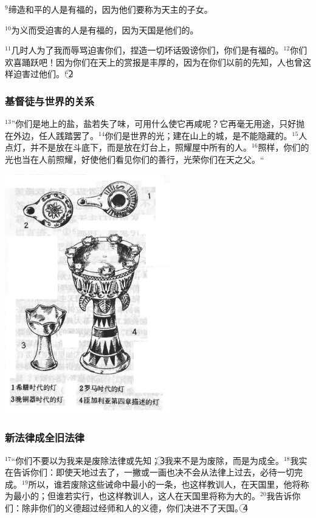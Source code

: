 $^{9}$缔造和平的人是有福的，因为他们要称为天主的子女。

$^{10}$为义而受迫害的人是有福的，因为天国是他们的。

$^{11}$几时人为了我而辱骂迫害你们，捏造一切坏话毁谤你们，你们是有福的。$^{12}$你们欢喜踊跃吧！因为你们在天上的赏报是丰厚的，因为在你们以前的先知，人也曾这样迫害过他们。“\textcircled{2}


\subsubsection{基督徒与世界的关系}
$^{13}$”你们是地上的盐，盐若失了味，可用什么使它再咸呢？它再毫无用途，只好抛在外边，任人践踏罢了。$^{14}$你们是世界的光；建在山上的城，是不能隐藏的。$^{15}$人点灯，并不是放在斗底下，而是放在灯台上，照耀屋中所有的人。$^{16}$照样，你们的光也当在人前照耀，好使他们看见你们的善行，光荣你们在天之父。“
\begin{center}
  \includegraphics[width=72mm]{images/1514.png}
\end{center}


\subsubsection{新法律成全旧法律}
$^{17}$“你们不要以为我来是废除法律或先知；\textcircled{3}我来不是为废除，而是为成全。$^{18}$我实在告诉你们：即使天地过去了，一撇或一画也决不会从法律上过去，必待一切完成。$^{19}$所以，谁若废除这些诫命中最小的一条，也这样教训人，在天国里，他将称为最小的；但谁若实行，也这样教训人，这人在天国里将称为大的。$^{20}$我告诉你们：除非你们的义德超过经师和\UL[法利塞]人的义德，你们决进不了天国。\textcircled{4}

